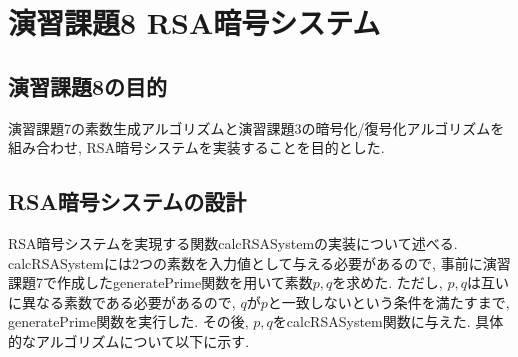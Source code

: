 \documentclass[xelatex, 11pt, a4paper, ja=standard]{bxjsarticle}
\begin{document}
\section{演習課題8 RSA暗号システム}
\subsection{演習課題8の目的}
演習課題7の素数生成アルゴリズムと演習課題3の暗号化/復号化アルゴリズムを組み合わせ, RSA暗号システムを実装することを目的とした. 

\subsection{RSA暗号システムの設計}
RSA暗号システムを実現する関数calcRSASystemの実装について述べる. 
calcRSASystemには2つの素数を入力値として与える必要があるので, 
事前に演習課題7で作成したgeneratePrime関数を用いて素数$p, q$を求めた. 
ただし, $p, q$は互いに異なる素数である必要があるので, $q$が$p$と一致しないという条件を満たすまで, 
generatePrime関数を実行した. 
その後, $p, q$をcalcRSASystem関数に与えた. 
具体的なアルゴリズムについて以下に示す. 
\begin{center}
\end{center}
\end{document}
